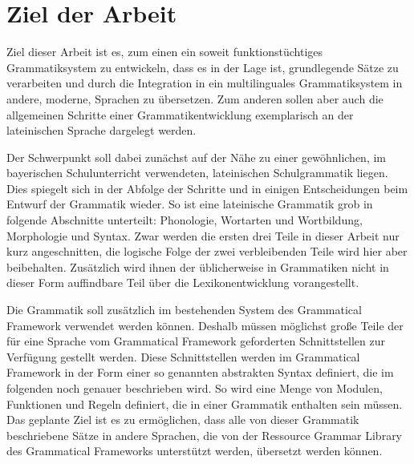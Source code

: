 \section{Ziel der Arbeit}
\label{sec:ziel}
Ziel dieser Arbeit ist es, zum einen ein soweit funktionstüchtiges Grammatiksystem zu entwickeln, dass es in der Lage ist, grundlegende Sätze zu verarbeiten und durch die Integration in ein multilinguales Grammatiksystem in andere, moderne, Sprachen zu übersetzen. Zum anderen sollen aber auch die allgemeinen Schritte einer Grammatikentwicklung exemplarisch an der lateinischen Sprache dargelegt werden. \par
Der Schwerpunkt soll dabei zunächst auf der Nähe zu einer gewöhnlichen, im bayerischen Schulunterricht verwendeten, lateinischen Schulgrammatik liegen. Dies spiegelt sich in der Abfolge der Schritte und in einigen Entscheidungen beim Entwurf der Grammatik wieder. So ist eine lateinische Grammatik grob in folgende Abschnitte unterteilt: Phonologie, Wortarten und Wortbildung, Morphologie und Syntax. Zwar werden die ersten drei Teile in dieser Arbeit nur kurz angeschnitten, die logische Folge der zwei verbleibenden Teile wird hier aber beibehalten. Zusätzlich wird ihnen der üblicherweise in Grammatiken nicht in dieser Form auffindbare Teil über die Lexikonentwicklung vorangestellt. \par
Die Grammatik soll zusätzlich im bestehenden System des Grammatical Framework verwendet werden können. Deshalb müssen möglichst große Teile der für eine Sprache vom Grammatical Framework geforderten Schnittstellen zur Verfügung gestellt werden. Diese Schnittstellen werden im Grammatical Framework in der Form einer so genannten abstrakten Syntax definiert, die im folgenden noch genauer beschrieben wird. So wird eine Menge von Modulen, Funktionen und Regeln definiert, die in einer Grammatik enthalten sein müssen. Das geplante Ziel ist es zu ermöglichen, dass alle von dieser Grammatik beschriebene Sätze in andere Sprachen, die von der Ressource Grammar Library des Grammatical Frameworks unterstützt werden, übersetzt werden können.
\pagebreak
